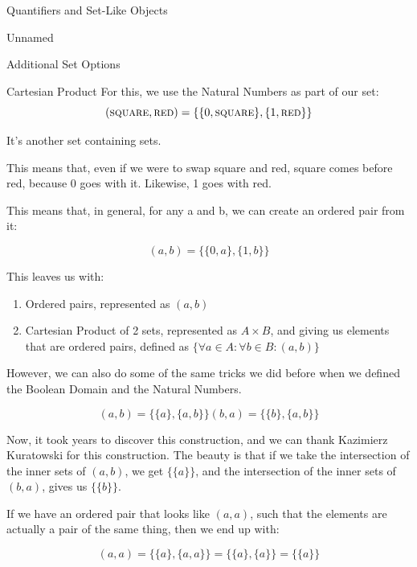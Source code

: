 \begin{part}{Quantifiers and Set-Like Objects}
\begin{chapter}{Unnamed}
\begin{section}{Additional Set Options}
\begin{subsection}{Cartesian Product}
                For this, we use the Natural Numbers as part of our set:
                $$
                    (\textsc{square}, \textsc{red} ) = \{\{0, \textsc{square}\}, \{1, \textsc{red}\}\}
                $$
                
                It's another set containing sets.
                
                This means that, even if we were to swap square and red, square comes before red, because 0 goes with it. Likewise, 1 goes with red.
                
                This means that, in general, for any a and b, we can create an ordered pair from it:
                
                $$
                    (a, b) = \{\{0, a\}, \{1, b\}\}
                $$
                
                This leaves us with:
                \begin{enumerate}
                    \item Ordered pairs, represented as $(a, b)$
                    \item Cartesian Product of 2 sets, represented as $A \times B$, and giving us elements that are ordered pairs, defined as $\{ \forall a\in A : \forall b \in B : (a, b) \}$
                \end{enumerate}
                
                However, we can also do some of the same tricks we did before when we defined the Boolean Domain and the Natural Numbers.
                
                $$
                    (a, b) = \{ \{a\}, \{a, b\} \}
                    (b, a) = \{ \{b\}, \{a, b\} \}
                $$
                
                Now, it took years to discover this construction, and we can thank  Kazimierz Kuratowski for this construction. The beauty is that if we take the intersection of the inner sets of $(a, b)$, we get $\{ \{ a \} \}$, and the intersection of the inner sets of $(b, a)$, gives us $\{ \{ b \} \}$.
                
                If we have an ordered pair that looks like $(a, a)$, such that the elements are actually a pair of the same thing, then we end up with:
                
                $$
                    (a, a) = \{ \{ a \}, \{a, a \} \} = \{ \{ a \}, \{ a \} \} = \{ \{ a \} \}
                $$
                

\end{subsection}
\end{section}
\end{chapter}
\end{part}

